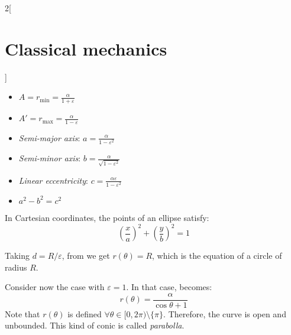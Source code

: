 \documentclass[../../../main_physics.tex]{subfiles}
\begin{document}
\begin{multicols}{2}[\section{Classical mechanics}]
\begin{definition}
    \begin{itemize}
      \item $\displaystyle A=r_\text{min}=\frac{\alpha}{1+\varepsilon}$
      \item $\displaystyle A'=r_\text{max}=\frac{\alpha}{1-\varepsilon}$
      \item \emph{Semi-major axis}: $\displaystyle a=\frac{\alpha}{1-\varepsilon^2}$
      \item \emph{Semi-minor axis}: $\displaystyle b=\frac{\alpha}{\sqrt{1-\varepsilon^2}}$
      \item \emph{Linear eccentricity}: $\displaystyle c=\frac{\alpha\varepsilon}{1-\varepsilon^2}$
      \item $a^2-b^2=c^2$
    \end{itemize}
    In Cartesian coordinates, the points of an ellipse satisfy: $${\left(\frac{x}{a}\right)}^2+{\left(\frac{y}{b}\right)}^2=1$$
    \begin{center}
      \begin{minipage}{\linewidth}
        \centering
        
        \label{CM_ellipse}
      \end{minipage}
    \end{center}
  \end{definition}
  \begin{proposition}
    Taking $d=R/\varepsilon$, from  we get $\displaystyle r(\theta)=R$, which is the equation of a circle of radius $R$.
  \end{proposition}
  \begin{definition}[Parabolla: $\varepsilon=1$]
    Consider now the case with $\varepsilon=1$. In that case,  becomes: $$r(\theta)=\frac{\alpha}{\cos\theta+ 1}$$ Note that $r(\theta)$ is defined $\forall\theta\in[0,2\pi)\setminus\{\pi\}$. Therefore, the curve is open and unbounded. This kind of conic is called \emph{parabolla}.


\end{definition}
\end{multicols}
\end{document}
